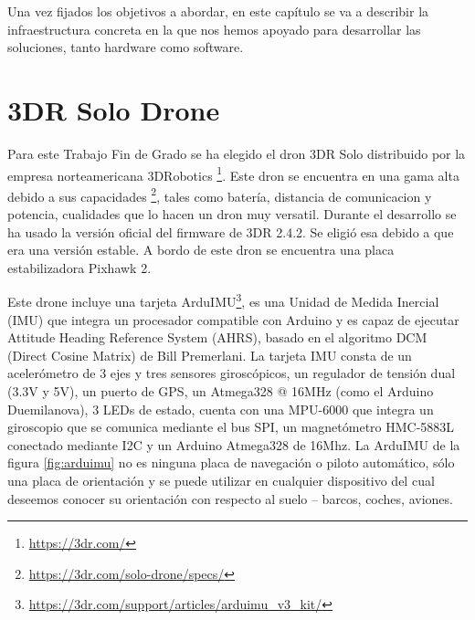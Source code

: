 Una vez fijados los objetivos a abordar, en este capítulo se va a
describir la infraestructura concreta en la que nos hemos apoyado
para desarrollar las soluciones, tanto hardware como software.

\section{3DR Solo Drone}
Para este Trabajo Fin de Grado se ha elegido el dron 3DR Solo distribuido por la empresa norteamericana 3DRobotics \cite{3dr}\footnote{\url{https://3dr.com/}}. Este dron se encuentra en una gama alta debido a sus capacidades \footnote{\url{https://3dr.com/solo-drone/specs/}}, tales como batería, distancia de comunicacion y potencia, cualidades que lo hacen un dron muy versatil. Durante el desarrollo se ha usado la versión oficial del firmware de 3DR 2.4.2. Se eligió esa debido a que era una versión estable. A bordo de este dron se encuentra una placa estabilizadora Pixhawk 2.

Este drone incluye una tarjeta ArduIMU\footnote{\url{https://3dr.com/support/articles/arduimu_v3_kit/}}, es una Unidad de Medida Inercial (IMU) que integra un procesador compatible con Arduino y es capaz de ejecutar Attitude Heading Reference System (AHRS), basado en el algoritmo DCM (Direct Cosine Matrix) de Bill Premerlani. La tarjeta IMU consta de un acelerómetro de 3 ejes y tres sensores giroscópicos, un regulador de tensión dual (3.3V y 5V), un puerto de GPS, un Atmega328 @ 16MHz (como el Arduino Duemilanova), 3 LEDs de estado, cuenta con una MPU-6000 que integra un giroscopio que se comunica mediante el bus SPI, un magnetómetro HMC-5883L conectado mediante I2C y un Arduino Atmega328 de 16Mhz. La ArduIMU de la figura \ref{fig:arduimu} no es ninguna placa de navegación o piloto automático, sólo una placa de orientación y se puede utilizar en cualquier dispositivo del cual deseemos conocer su orientación con respecto al suelo – barcos, coches, aviones.

